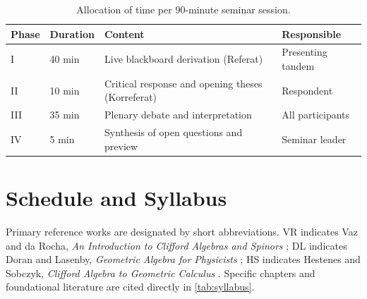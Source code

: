 \documentclass[11pt,a4paper]{article}
\begin{document}
\begin{table}[ht]
\centering
\caption{Allocation of time per 90-minute seminar session.}
\label{tab:session_structure}
\begin{tabular}{@{}llll@{}}
\toprule
Phase & Duration & Content & Responsible \\
\midrule
I   & 40 min & Live blackboard derivation (Referat) & Presenting tandem \\
II  & 10 min & Critical response and opening theses (Korreferat) & Respondent \\
III & 35 min & Plenary debate and interpretation & All participants \\
IV  & 5 min  & Synthesis of open questions and preview & Seminar leader \\
\bottomrule
\end{tabular}
\end{table}

\section{Schedule and Syllabus}
\label{sec:schedule}

Primary reference works are designated by short abbreviations.
VR indicates Vaz and da Rocha, \emph{An Introduction to Clifford Algebras and
Spinors} \cite{vazIntroductionCliffordAlgebras2016}; DL indicates Doran and
Lasenby, \emph{Geometric Algebra for Physicists}
\cite{doranGeometricAlgebraPhysicists2013}; HS indicates Hestenes and Sobczyk,
\emph{Clifford Algebra to Geometric Calculus}
\cite{hestenesCliffordAlgebraGeometric1984}.
Specific chapters and foundational literature are cited directly in
\cref{tab:syllabus}.
\end{document}
